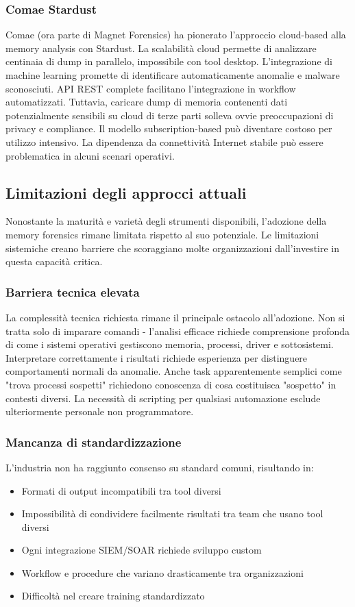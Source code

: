 \subsubsection{Comae Stardust}
Comae (ora parte di Magnet Forensics) ha pionerato l'approccio cloud-based alla memory analysis con Stardust. La scalabilità cloud permette di analizzare centinaia di dump in parallelo, impossibile con tool desktop. L'integrazione di machine learning promette di identificare automaticamente anomalie e malware sconosciuti. API REST complete facilitano l'integrazione in workflow automatizzati. Tuttavia, caricare dump di memoria contenenti dati potenzialmente sensibili su cloud di terze parti solleva ovvie preoccupazioni di privacy e compliance. Il modello subscription-based può diventare costoso per utilizzo intensivo. La dipendenza da connettività Internet stabile può essere problematica in alcuni scenari operativi.

\subsection{Limitazioni degli approcci attuali}

Nonostante la maturità e varietà degli strumenti disponibili, l'adozione della memory forensics rimane limitata rispetto al suo potenziale. Le limitazioni sistemiche creano barriere che scoraggiano molte organizzazioni dall'investire in questa capacità critica.

\subsubsection{Barriera tecnica elevata}
La complessità tecnica richiesta rimane il principale ostacolo all'adozione. Non si tratta solo di imparare comandi - l'analisi efficace richiede comprensione profonda di come i sistemi operativi gestiscono memoria, processi, driver e sottosistemi. Interpretare correttamente i risultati richiede esperienza per distinguere comportamenti normali da anomalie. Anche task apparentemente semplici come "trova processi sospetti" richiedono conoscenza di cosa costituisca "sospetto" in contesti diversi. La necessità di scripting per qualsiasi automazione esclude ulteriormente personale non programmatore.

\subsubsection{Mancanza di standardizzazione}
L'industria non ha raggiunto consenso su standard comuni, risultando in:
\begin{itemize}
    \item Formati di output incompatibili tra tool diversi
    \item Impossibilità di condividere facilmente risultati tra team che usano tool diversi  
    \item Ogni integrazione SIEM/SOAR richiede sviluppo custom
    \item Workflow e procedure che variano drasticamente tra organizzazioni
    \item Difficoltà nel creare training standardizzato
\end{itemize}

